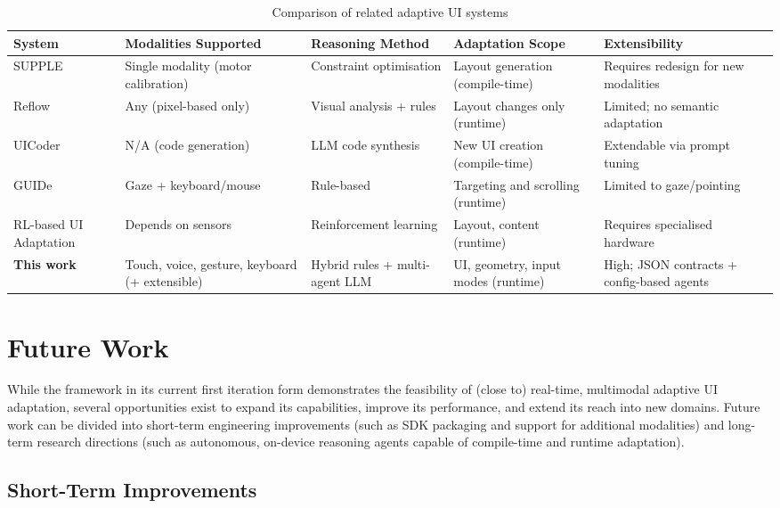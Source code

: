 \begin{table}[h]
\centering
\small
\caption{Comparison of related adaptive UI systems}
\label{tab:related-comparison}
\begin{tabular}{p{2cm}p{3cm}p{3cm}p{3cm}p{3cm}}
\toprule
\textbf{System} & \textbf{Modalities Supported} & \textbf{Reasoning Method} & \textbf{Adaptation Scope} & \textbf{Extensibility} \\
\midrule
SUPPLE & Single modality (motor calibration) & Constraint optimisation & Layout generation (compile-time) & Requires redesign for new modalities \\
Reflow & Any (pixel-based only) & Visual analysis + rules & Layout changes only (runtime) & Limited; no semantic adaptation \\
UICoder & N/A (code generation) & LLM code synthesis & New UI creation (compile-time) & Extendable via prompt tuning \\
GUIDe & Gaze + keyboard/mouse & Rule-based & Targeting and scrolling (runtime) & Limited to gaze/pointing \\
RL-based UI Adaptation & Depends on sensors & Reinforcement learning & Layout, content (runtime) & Requires specialised hardware \\
\textbf{This work} & Touch, voice, gesture, keyboard (+ extensible) & Hybrid rules + multi-agent LLM & UI, geometry, input modes (runtime) & High; JSON contracts + config-based agents \\
\bottomrule
\end{tabular}
\end{table}

\section{Future Work} 
While the framework in its current first iteration form demonstrates the feasibility of (close to) real-time, multimodal adaptive UI adaptation, several opportunities exist to expand its capabilities, improve its performance, and extend its reach into new domains. Future work can be divided into short-term engineering improvements (such as SDK packaging and support for additional modalities) and long-term research directions (such as autonomous, on-device reasoning agents capable of compile-time and runtime adaptation).

\subsection{Short-Term Improvements}

